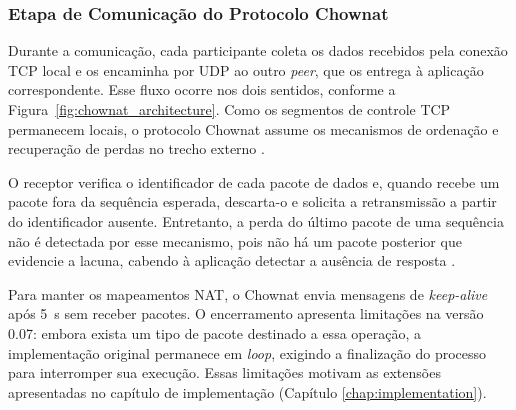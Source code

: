 \subsubsection{Etapa de Comunicação do Protocolo Chownat}

Durante a comunicação, cada participante coleta os dados recebidos pela conexão TCP local e os encaminha por UDP ao outro \textit{peer}, que os entrega à aplicação correspondente. Esse fluxo ocorre nos dois sentidos, conforme a Figura~\ref{fig:chownat_architecture}. Como os segmentos de controle TCP permanecem locais, o protocolo Chownat assume os mecanismos de ordenação e recuperação de perdas no trecho externo \citep{kamkar2004chownatv07}.

O receptor verifica o identificador de cada pacote de dados e, quando recebe um pacote fora da sequência esperada, descarta-o e solicita a retransmissão a partir do identificador ausente. Entretanto, a perda do último pacote de uma sequência não é detectada por esse mecanismo, pois não há um pacote posterior que evidencie a lacuna, cabendo à aplicação detectar a ausência de resposta \citep{kamkar2004chownatv07}.

Para manter os mapeamentos NAT, o Chownat envia mensagens de \textit{keep-alive} após 5~s sem receber pacotes. O encerramento apresenta limitações na versão 0.07: embora exista um tipo de pacote destinado a essa operação, a implementação original permanece em \textit{loop}, exigindo a finalização do processo para interromper sua execução. Essas limitações motivam as extensões apresentadas no capítulo de implementação (Capítulo \ref{chap:implementation}).

